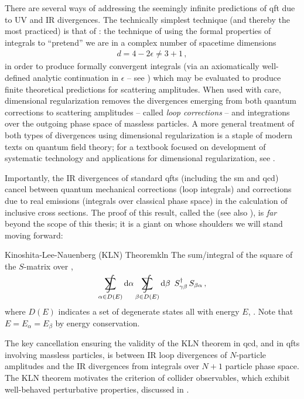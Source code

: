 There are several ways of addressing the seemingly infinite predictions of \gls{qft} due to UV and IR divergences.
%
The technically simplest technique (and thereby the most practiced) is that of :
%
the technique of using the formal properties of integrals to ``pretend'' we are in a complex number of spacetime dimensions
\begin{align}
    d = 4 - 2\epsilon \neq 3 + 1
    \,,
\end{align}
in order to produce formally convergent integrals (via an axiomatically well-defined analytic continuation in \(\epsilon\) -- see ) which may be evaluated to produce finite theoretical predictions for scattering amplitudes.
%
When used with care, dimensional regularization removes the divergences emerging from both quantum corrections to scattering amplitudes -- called \textit{loop corrections} -- and integrations over the outgoing phase space of massless particles.
%
A more general treatment of both types of divergences using dimensional regularization is a staple of modern texts on quantum field theory;
%
for a textbook focused on development of systematic technology and applications for dimensional regularization, see .


Importantly, the IR divergences of standard \glspl{qft} (including the \gls{sm} and \gls{qcd}) cancel between quantum mechanical corrections (loop integrals) and corrections due to real emissions (integrals over classical phase space) in the calculation of inclusive cross sections.
%
The proof of this result, called the  \cite{Kinoshita:1962ur,Lee:1964is} (see also ), is \textit{far} beyond the scope of this thesis;
%
it is a giant on whose shoulders we will stand moving forward:

\begin{theorembox}{Kinoshita-Lee-Nauenberg (KLN) Theorem}{kln}
    The sum/integral of the square of the \(S\)-matrix over ,
    \begin{align}
        \SumInt_{\alpha \in D(E)}
        \dd \alpha
        \SumInt_{\beta \in  D(E)}
        \dd \beta
        \,\,\,
        S^\dagger_{\gamma \beta}
        \,
        S_{\beta \alpha}
        \,,
    \end{align}
    where \(D(E)\) indicates a set of degenerate states all with energy \(E\), .
    Note that \(E = E_\alpha = E_\beta\) by energy conservation.
\end{theorembox}
%
The key cancellation ensuring the validity of the KLN theorem in \gls{qcd}, and in \glspl{qft} involving massless particles, is between IR loop divergences of \(N\)-particle amplitudes and the IR divergences from integrals over \(N+1\) particle phase space.
%
The KLN theorem motivates the criterion of  collider \glspl{observable}, which exhibit well-behaved perturbative properties, discussed in .

